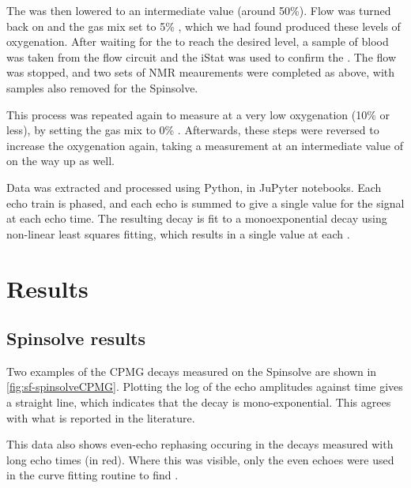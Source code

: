The \SOtwo was then lowered to an intermediate value (around 50\%).
Flow was turned back on and the gas mix set to 5\% \Otwo, which we had found produced these levels of oxygenation.
After waiting for the \SOtwo to reach the desired level, a sample of blood was taken from the flow circuit and the iStat was used to confirm the \SOtwo.
The flow was stopped, and two sets of NMR meaurements were completed as above, with samples also removed for the Spinsolve.

This process was repeated again to measure \Ttwo at a very low oxygenation (10\% or less), by setting the gas mix to 0\% \Otwo.
Afterwards, these steps were reversed to increase the oxygenation again, taking a measurement at an intermediate value of \SOtwo on the way up as well.

Data was extracted and processed using Python, in JuPyter notebooks.
Each echo train is phased, and each echo is summed to give a single value for the signal at each echo time.
The resulting decay is fit to a monoexponential decay using non-linear least squares fitting, which results in a single \Ttwo value at each \SOtwo.

\section{Results}
\subsection{Spinsolve results}
Two examples of the CPMG decays measured on the Spinsolve are shown in \autoref{fig:sf-spinsolveCPMG}.
Plotting the log of the echo amplitudes against time gives a straight line, which indicates that the decay is mono-exponential.
This agrees with what is reported in the literature.

This data also shows even-echo rephasing occuring in the decays measured with long echo times (in red).
Where this was visible, only the even echoes were used in the curve fitting routine to find \Ttwo.

